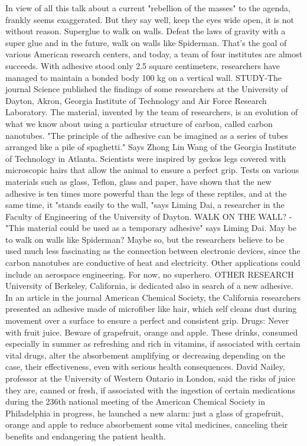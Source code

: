 In view of all this talk about a current "rebellion of the masses" to the agenda, frankly seems exaggerated.
But they say well, keep the eyes wide open, it is not without reason.
Superglue to walk on walls.
Defeat the laws of gravity with a super glue and in the future, walk on walls like Spiderman.
That's the goal of various American research centers, and today, a team of four institutes are almost succeeds.
With adhesive stood only 2.5 square centimeters, researchers have managed to maintain a bonded body 100 kg on a vertical wall.
STUDY-The journal Science published the findings of some researchers at the University of Dayton, Akron, Georgia Institute of Technology and Air Force Research Laboratory.
The material, invented by the team of researchers, is an evolution of what we know about using a particular structure of carbon, called carbon nanotubes.
"The principle of the adhesive can be imagined as a series of tubes arranged like a pile of spaghetti." Says Zhong Lin Wang of the Georgia Institute of Technology in Atlanta.
Scientists were inspired by geckos legs covered with microscopic hairs that allow the animal to ensure a perfect grip.
Tests on various materials such as glass, Teflon, glass and paper, have shown that the new adhesive is ten times more powerful than the legs of these reptiles, and at the same time, it "stands easily to the wall, "says Liming Dai, a researcher in the Faculty of Engineering of the University of Dayton.
WALK ON THE WALL? - "This material could be used as a temporary adhesive" says Liming Dai.
May be to walk on walls like Spiderman? Maybe so, but the researchers believe to be used much less fascinating as the connection between electronic devices, since the carbon nanotubes are conductive of heat and electricity.
Other applications could include an aerospace engineering.
For now, no superhero.
OTHER RESEARCH University of Berkeley, California, is dedicated also in search of a new adhesive.
In an article in the journal American Chemical Society, the California researchers presented an adhesive made of microfiber like hair, which self cleans dust during movement over a surface to ensure a perfect and consistent grip.
Drugs: Never with fruit juice.
Beware of grapefruit, orange and apple.
These drinks, consumed especially in summer as refreshing and rich in vitamins, if associated with certain vital drugs, alter the absorbement amplifying or decreasing depending on the case, their effectiveness, even with serious health consequences.
David Nailey, professor at the University of Western Ontario in London, said the risks of juice they are, canned or fresh, if associated with the ingestion of certain medications during the 236th national meeting of the American Chemical Society in Philadelphia in progress, he launched a new alarm: just a glass of grapefruit, orange and apple to reduce absorbement some vital medicines, canceling their benefits and endangering the patient health.
